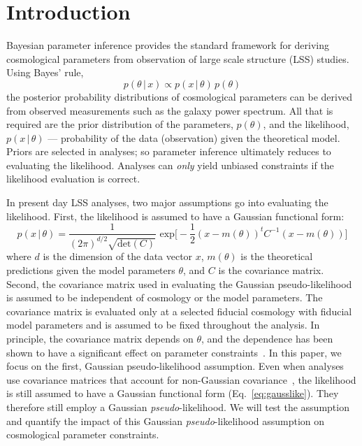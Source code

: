 \documentclass[12pt, letterpaper, preprint]{aastex6}
\newcommand{\beq}{\begin{equation}}
\newcommand{\eeq}{\end{equation}}
\newcommand{\lss}{{\small{LSS}}\xspace}
\begin{document}
\section{Introduction}
Bayesian parameter inference provides the standard framework for 
deriving cosmological parameters from observation of large scale 
structure (\lss) studies. %
Using Bayes' rule, 
\beq
p( \theta\,|\,x) \propto p( x\,|\,\theta) \, p(\theta)
\eeq
the posterior probability distributions of cosmological parameters
can be derived from observed measurements such as the galaxy 
power spectrum. All that is required are the prior distribution of the 
parameters, $p(\theta)$, and the likelihood, $p( x\,|\,\theta)$ --- 
probability of the data (observation) given the theoretical model.
Priors are selected in analyses; so parameter inference ultimately 
reduces to evaluating the likelihood. Analyses can {\em only} yield 
unbiased constraints if the likelihood evaluation is correct. 

In present day \lss analyses, two major assumptions go into evaluating the 
likelihood. First, the likelihood is assumed to have a Gaussian functional 
form: 
\beq \label{eq:gausslike}
p(x\,|\,\theta) = \frac{1}{(2\pi)^{d/2} \sqrt{\mathrm{det}(C)}}\,\,\mathrm{exp}\bigg[-\frac{1}{2}(x - m(\theta))^{t} C^{-1} (x - m(\theta))\bigg]
\eeq
where $d$ is the dimension of the data vector $x$, $m(\theta)$ is the
theoretical predictions given the model parameters $\theta$, and $C$ 
is the covariance matrix. Second, the covariance matrix used in evaluating the Gaussian pseudo-likelihood
is assumed to be independent of cosmology or the model parameters.
The covariance matrix is evaluated only at a selected fiducial cosmology with  
fiducial model parameters and is assumed to be fixed throughout  
the analysis. In principle, the covariance matrix depends on $\theta$, 
and the dependence has been shown to have a significant effect 
on parameter constraints~\citep[\emph{e.g.}][]{eifler2009, morrison2013, white2015}. 
In this paper, we focus on the first, Gaussian pseudo-likelihood assumption. 
Even when analyses use covariance matrices that account for non-Gaussian 
covariance~\citep[\emph{e.g.}][]{scoccimarro1999, hu2001, oconnell2016}, 
the likelihood is still assumed to have a Gaussian functional form
(Eq.~\ref{eq:gausslike}). They therefore still employ a Gaussian \emph{pseudo}-likelihood. 
We will test the assumption and quantify the impact of this Gaussian
\emph{pseudo}-likelihood assumption on cosmological parameter constraints. 
\end{document}
